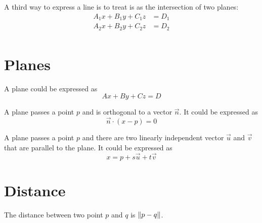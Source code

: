\begin{definition}
    A third way to express a line is to treat is as the intersection of two planes:
    \begin{equation}
        \begin{aligned}
            A_1 x + B_1 y + C_1 z &= D_1 \\
            A_2 x + B_2 y + C_2 z &= D_2 \\
        \end{aligned}
    \end{equation}
\end{definition}


%
%
\section{Planes}
      
\begin{definition}
    A plane could be expressed as
    \begin{equation}
        A x + B y + C z = D
    \end{equation}
\end{definition}

\begin{definition}
    A plane passes a point $p$ and is orthogonal to a vector $\vec{n}$. It could be expressed as 
    \begin{equation}
        \vec{n} \cdot (x - p) = 0
    \end{equation}
\end{definition}

\begin{definition}
    A plane passes a point $p$ and there are two linearly independent vector $\vec{u}$ and $\vec{v}$ that are parallel to the plane. It could be expressed as
    \begin{equation}
        x = p + s \vec{u} + t \vec{v}
    \end{equation}
\end{definition}


%
%

\section{Distance}

\begin{theorem}
    The distance between two point $p$ and $q$ is $\left\Vert {p - q} \right\Vert$.
\end{theorem}

